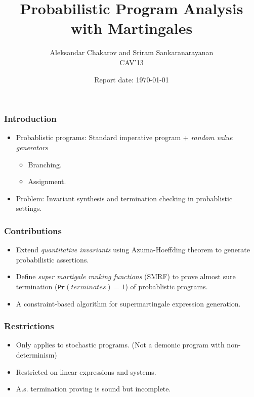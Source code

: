 \documentclass[11pt]{beamer}
\title{Probabilistic Program Analysis with Martingales}
\author{Aleksandar Chakarov and Sriram Sankaranarayanan\\
CAV'13
}
\date{Report date: \today}
\begin{document}
\maketitle
\begin{frame}\frametitle{Introduction}

\begin{itemize}
\item 
Probablistic programs: Standard imperative program + \emph{random value generators}


\begin{itemize}
\item Branching.

\item Assignment.

\end{itemize}

\item 
Problem: Invariant synthesis and termination checking in probablistic settings.



\end{itemize}
\end{frame}

\begin{frame}\frametitle{Contributions}
\begin{itemize}
\item Extend \emph{quantitative invariants} using Azuma-Hoeffding theorem to generate probabilistic assertions.

\item Define \emph{super martigale ranking functions} (SMRF) to prove almost sure termination ($\texttt{Pr}(terminates) = 1$) of probablistic programs.
\item A constraint-based algorithm for supermartingale expression generation.
\end{itemize}
\end{frame}

\begin{frame}\frametitle{Restrictions}

\begin{itemize}

\item Only applies to stochastic programs. (Not a demonic program with non-determinism)

\item Restricted on linear expressions and systems.

\item A.s. termination proving is sound but incomplete.
\end{itemize}
\end{frame}
\end{document}
